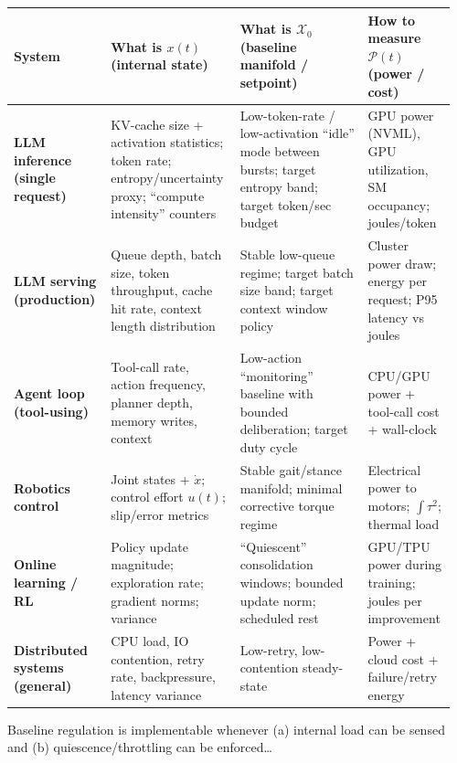 \documentclass[11pt]{article}
\begin{document}
\begingroup
\setlength{\emergencystretch}{3em}
\sloppy
\noindent\small\begin{tabular}{@{}p{0.19\linewidth}p{0.29\linewidth}p{0.29\linewidth}p{0.19\linewidth}@{}}
\textbf{System} &
\textbf{What is \(x(t)\) (internal state)} &
\textbf{What is \(\mathcal{X}_0\) (baseline manifold / setpoint)} &
\textbf{How to measure \(\mathcal{P}(t)\) (power / cost)}\\
\hline

\textbf{LLM inference (single request)} &
KV-cache size + activation statistics; token rate; entropy/uncertainty proxy; “compute intensity” counters &
Low-token-rate / low-activation “idle” mode between bursts; target entropy band; target token/sec budget &
GPU power (NVML), GPU utilization, SM occupancy; joules/token\\[0.7em]

\textbf{LLM serving (production)} &
Queue depth, batch size, token throughput, cache hit rate, context length distribution &
Stable low-queue regime; target batch size band; target context window policy &
Cluster power draw; energy per request; P95 latency vs joules\\[0.7em]

\textbf{Agent loop (tool-using)} &
Tool-call rate, action frequency, planner depth, memory writes, context &
Low-action “monitoring” baseline with bounded deliberation; target duty cycle &
CPU/GPU power + tool-call cost + wall-clock\\[0.7em]

\textbf{Robotics control} &
Joint states + \(\dot{x}\); control effort \(u(t)\); slip/error metrics &
Stable gait/stance manifold; minimal corrective torque regime &
Electrical power to motors; \(\int \tau^{2}\); thermal load\\[0.7em]

\textbf{Online learning / RL} &
Policy update magnitude; exploration rate; gradient norms; variance &
“Quiescent” consolidation windows; bounded update norm; scheduled rest &
GPU/TPU power during training; joules per improvement\\[0.7em]

\textbf{Distributed systems (general)} &
CPU load, IO contention, retry rate, backpressure, latency variance &
Low-retry, low-contention steady-state &
Power + cloud cost + failure/retry energy\\
\end{tabular}\normalsize
\endgroup

Baseline regulation is implementable whenever (a) internal load can be sensed and (b) quiescence/throttling can be enforced… 
\end{document}
